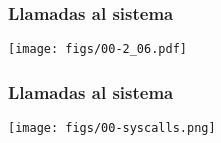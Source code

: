 \documentclass[letter]{beamer}
\begin{document}
\begin{frame}
  \frametitle{Llamadas al sistema}

  \begin{center}
    \texttt{[image: figs/00-2\_06.pdf]}
  \end{center}

\end{frame}

\begin{frame}
  \frametitle{Llamadas al sistema}

  \begin{center}
    \texttt{[image: figs/00-syscalls.png]}
  \end{center}

\end{frame}


%  
%
%
\end{document}

